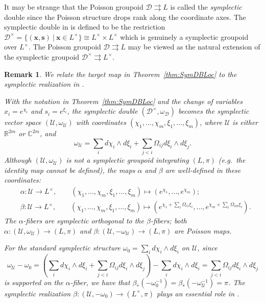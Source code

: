 \documentclass{amsart}
\newtheorem{remark}[theorem]{Remark}
\numberwithin{equation}{section}
\newcommand{\bfs}{{\boldsymbol{s}}}
\newcommand{\bfx}{{\boldsymbol{x}}}
\newcommand{\cD}{\mathcal{D}}
\newcommand{\cU}{\mathcal{U}}
\newcommand{\CC}{\mathbb{C}}
\newcommand{\RR}{\mathbb{R}}
\newcommand{\rra}{\rightrightarrows}
\begin{document}
It may be strange that the Poisson groupoid $\cD \rra L$ is called the \emph{symplectic} double since the Poisson structure drops rank along the coordinate axes.
The symplectic double in \cite{FG09c} is defined to be the restriction $\cD^\times =\{(\bfx, \bfs) ~|~ \bfx \in L^\times \} \cong L^\times \times L^\times$ which is genuinely a symplectic groupoid over $L^\times$.
The Poisson groupoid $\cD \rra L$ may be viewed as the natural extension of the symplectic groupoid $\cD^\times \rra L^\times$.
\begin{remark}
  We relate the target map in Theorem~\ref{thm:SymDBLoc} to the symplectic realization in \cite{GNR17}.
	
  With the notation in Theorem~\ref{thm:SymDBLoc} and the change of variables $x_i = e^{\chi_i}$ and $s_i = e^{\xi_i}$, the symplectic double $(\cD^\times, \omega_\cD)$ becomes the symplectic vector space $(\cU, \omega_\cU)$ with coordinates $(\chi_1, \ldots, \chi_m, \xi_1, \ldots, \xi_m)$, where $\cU$ is either $\RR^{2m}$ or $\CC^{2m}$, and
  \[\omega_\cU = \sum_{i} d\chi_i \wedge d\xi_i + \sum_{j < i} \Omega_{ij} d\xi_i \wedge d\xi_j.\]
  Although $(\cU, \omega_\cU)$ is not a symplectic groupoid integrating $(L, \pi)$ (e.g.\ the identity map cannot be defined), the maps $\alpha$ and $\beta$ are well-defined in these coordinates:
  \begin{align*}
    & \alpha: \cU \to L^\times, \qquad (\chi_1, \ldots, \chi_m, \xi_1, \ldots, \xi_m) \mapsto \left(e^{\chi_1}, \ldots, e^{\chi_m}\right); \\
    & \beta: \cU \to L^\times, \qquad (\chi_1, \ldots, \chi_m, \xi_1, \ldots, \xi_m) \mapsto \left(e^{\chi_1+\sum_i\Omega_{i1}\xi_i}, \ldots, e^{\chi_m+\sum_i\Omega_{im}\xi_i}\right).
  \end{align*}
  The $\alpha$-fibers are symplectic orthogonal to the $\beta$-fibers; both $\alpha: (\cU, \omega_\cU) \to (L, \pi)$ and $\beta: (\cU, - \omega_\cU) \to (L, \pi)$ are Poisson maps.

  For the standard symplectic structure $\omega_0 = \sum_{i} d\chi_i \wedge d\xi_i$ on $\cU$, since
  \[\omega_\cU - \omega_0 = \left(\sum_{i} d\chi_i \wedge d\xi_i + \sum_{j < i} \Omega_{ij} d\xi_i \wedge d\xi_j \right) - \sum_{i} d\chi_i \wedge d\xi_i  =\sum_{j < i} \Omega_{ij} d\xi_i \wedge d\xi_j\]
  is supported on the $\alpha$-fiber, we have that $\beta_*(-\omega_0^{-1}) = \beta_*(-\omega_\cU^{-1}) = \pi$.
  The symplectic realization $\beta: (\cU, -\omega_0) \to (L^\times, \pi)$ plays an essential role in \cite{GNR17}.
\end{remark}
\end{document}
